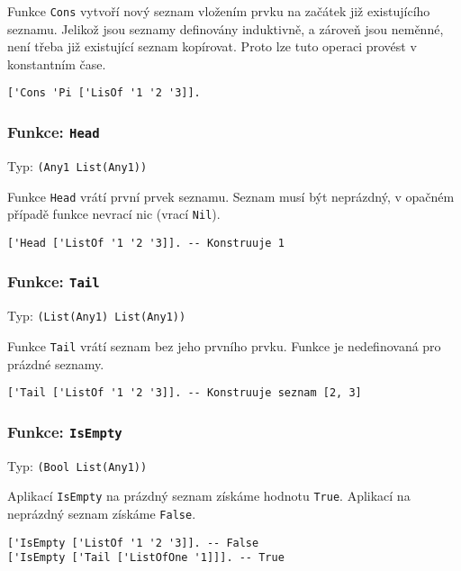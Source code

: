 Funkce \lstinline{Cons} vytvoří nový seznam vložením prvku na začátek již existujícího seznamu.
Jelikož jsou seznamy definovány induktivně, a zároveň jsou neměnné, není třeba již existující seznam
kopírovat. Proto lze tuto operaci provést v konstantním čase.

\begin{lstlisting}[caption={Ukázka využití Cons}]
['Cons 'Pi ['LisOf '1 '2 '3]].
\end{lstlisting}

\subsubsection*{Funkce: \lstinline|Head|}
Typ: \lstinline{(Any1 List(Any1))}

Funkce \lstinline{Head} vrátí první prvek seznamu. Seznam musí být neprázdný, v opačném případě
funkce nevrací nic (vrací \lstinline{Nil}).

\begin{lstlisting}[caption={Ukázka využití Head}]
['Head ['ListOf '1 '2 '3]]. -- Konstruuje 1
\end{lstlisting}

\subsubsection*{Funkce: \lstinline|Tail|}
Typ: \lstinline{(List(Any1) List(Any1))}

Funkce \lstinline{Tail} vrátí seznam bez jeho prvního prvku. Funkce je nedefinovaná pro prázdné
seznamy.

\begin{lstlisting}[caption={Ukázka využití Head}]
['Tail ['ListOf '1 '2 '3]]. -- Konstruuje seznam [2, 3]
\end{lstlisting}

\subsubsection*{Funkce: \lstinline|IsEmpty|}
Typ: \lstinline{(Bool List(Any1))}

Aplikací \lstinline{IsEmpty} na prázdný seznam získáme hodnotu \lstinline{True}. Aplikací
na neprázdný seznam získáme \lstinline{False}.

\begin{lstlisting}[caption={Ukázka využití IsEmpty}]
['IsEmpty ['ListOf '1 '2 '3]]. -- False
['IsEmpty ['Tail ['ListOfOne '1]]]. -- True
\end{lstlisting}

